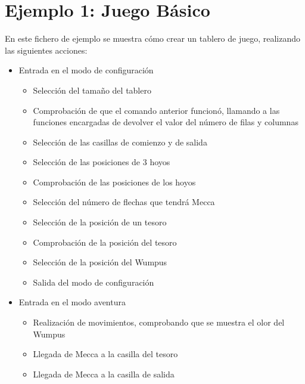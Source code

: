 \documentclass[a4paper,12pt,twoside,openright]{report}
\begin{document}
  
  \section{Ejemplo 1: Juego Básico}
  
  En este fichero de ejemplo se muestra cómo crear un tablero de juego, 
  realizando las siguientes acciones:
  
  \begin{itemize}
   \item Entrada en el modo de configuración
   \begin{itemize}
    \item Selección del tamaño del tablero
    \item Comprobación de que el comando anterior funcionó, llamando a las funciones 
    encargadas de devolver el valor del número de filas y columnas
    \item Selección de las casillas de comienzo y de salida
    \item Selección de las posiciones de 3 hoyos
    \item Comprobación de las posiciones de los hoyos
    \item Selección del número de flechas que tendrá Mecca
    \item Selección de la posición de un tesoro
    \item Comprobación de la posición del tesoro
    \item Selección de la posición del Wumpus
    \item Salida del modo de configuración
    \end{itemize}
   \item Entrada en el modo aventura
      \begin{itemize}
      \item Realización de movimientos, comprobando que se muestra el 
      olor del Wumpus
      \item Llegada de Mecca a la casilla del tesoro
      \item Llegada de Mecca a la casilla de salida
      \end{itemize}
   \end{itemize}
  
\end{document}
